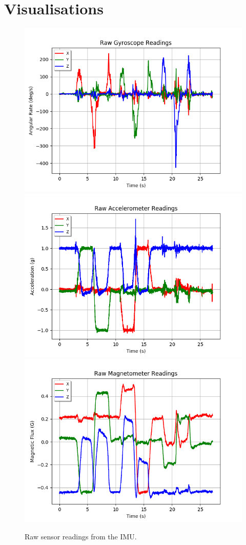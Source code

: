 \documentclass[11pt]{article}
\begin{document}
\section*{Visualisations}

\begin{figure}[htp]

\centering
\includegraphics[width=.32\textwidth]{gyro-unaltered}\hfill
\includegraphics[width=.32\textwidth]{acc-unaltered}\hfill
\includegraphics[width=.32\textwidth]{mag-unaltered}

\caption{Raw sensor readings from the IMU.}
\label{fig:raw-readings}

\end{figure}
\end{document}
